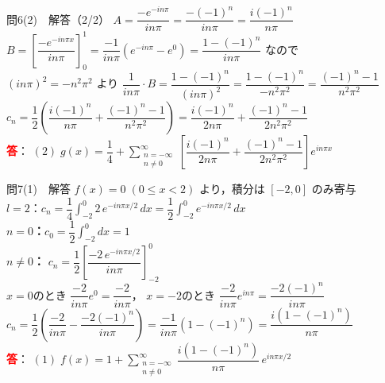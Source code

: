 \documentclass[professionalfonts]{beamer}
\begin{document}
\begin{frame}{問6(2)　解答（2/2）}
  $A = \dfrac{-e^{-in\pi}}{in\pi} = \dfrac{-(-1)^{n}}{in\pi} = \dfrac{i(-1)^{n}}{n\pi}$
  \hspace{8pt}{\footnotesize\textcolor{gray}{$-1/(in) = i/n$ を利用}}\\[6pt]
  $B = \left[\dfrac{-e^{-in\pi x}}{in\pi}\right]_{0}^{1}
    = \dfrac{-1}{in\pi}\!\left(e^{-in\pi}-e^{0}\right) = \dfrac{1-(-1)^{n}}{in\pi}$
  なので\\[4pt]
  $(in\pi)^{2} = -n^{2}\pi^{2}$ より
  $\dfrac{1}{in\pi}\cdot B = \dfrac{1-(-1)^{n}}{(in\pi)^{2}} = \dfrac{1-(-1)^{n}}{-n^{2}\pi^{2}} = \dfrac{(-1)^{n}-1}{n^{2}\pi^{2}}$\\[4pt]
  $c_{n} = \dfrac{1}{2}\!\left(\dfrac{i(-1)^{n}}{n\pi} + \dfrac{(-1)^{n}-1}{n^{2}\pi^{2}}\right)
    = \dfrac{i(-1)^{n}}{2n\pi} + \dfrac{(-1)^{n}-1}{2n^{2}\pi^{2}}$
  \\[8pt]\textcolor{red}{\textbf{答}}：
  $(2)\; g(x) = \dfrac{1}{4} + \displaystyle\sum_{\substack{n=-\infty \\ n\neq 0}}^{\infty} \!\left[\dfrac{i(-1)^{n}}{2n\pi}+\dfrac{(-1)^{n}-1}{2n^{2}\pi^{2}}\right] e^{in\pi x}$\\
\end{frame}

\begin{frame}{問7(1)　解答}
  $f(x)=0\;(0\leq x<2)$ より，積分は $[-2,0]$ のみ寄与\\[2pt]
  $l=2$：$c_{n} = \dfrac{1}{4}\displaystyle\int_{-2}^{0}2\,e^{-in\pi x/2}\,dx
    = \dfrac{1}{2}\displaystyle\int_{-2}^{0}e^{-in\pi x/2}\,dx$\\[4pt]
  \textbf{$n=0$：}$c_{0} = \dfrac{1}{2}\displaystyle\int_{-2}^{0}dx = 1$\\[2pt]
  \textbf{$n\neq 0$：}
  $c_{n} = \dfrac{1}{2}\!\left[\dfrac{-2\,e^{-in\pi x/2}}{in\pi}\right]_{-2}^{0}$\\[2pt]
  \hspace{1em}$x=0$のとき $\dfrac{-2}{in\pi}e^{0}=\dfrac{-2}{in\pi}$，
  $x=-2$のとき $\dfrac{-2}{in\pi}e^{in\pi}=\dfrac{-2(-1)^{n}}{in\pi}$\\[2pt]
  $c_{n} = \dfrac{1}{2}\!\left(\dfrac{-2}{in\pi}-\dfrac{-2(-1)^{n}}{in\pi}\right)
    = \dfrac{-1}{in\pi}(1-(-1)^{n}) = \dfrac{i(1-(-1)^{n})}{n\pi}$
  \hspace{4pt}{\footnotesize\textcolor{gray}{$1/(in)=-i/n$ を利用}}
  \\[4pt]\textcolor{red}{\textbf{答}}：
  $(1)\; f(x) = 1 + \displaystyle\sum_{\substack{n=-\infty \\ n\neq 0}}^{\infty} \dfrac{i(1-(-1)^{n})}{n\pi}\,e^{in\pi x/2}$\\
\end{frame}
\end{document}
